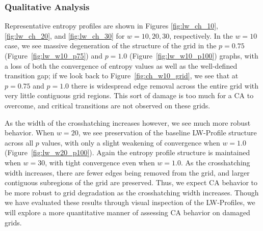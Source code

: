 \documentclass[a4paper,11pt,twoside]{report}
\begin{document}
\subsubsection*{Qualitative Analysis}

Representative entropy profiles are shown in Figures \ref{fig:lw_ch_10}, \ref{fig:lw_ch_20}, and \ref{fig:lw_ch_30} for $w=10,20,30$, respectively. In the $w=10$ case, we see massive degeneration of the structure of the grid in the $p=0.75$ (Figure~\ref{fig:lw_w10_p75}) and $p=1.0$ (Figure~\ref{fig:lw_w10_p100}) graphs, with a loss of both the convergence of entropy values as well as the well-defined transition gap; if we look back to Figure~\ref{fig:ch_w10_grid}, we see that at $p=0.75$ and $p=1.0$ there is widespread edge removal across the entire grid with very little contiguous grid regions. This sort of damage is too much for a CA to overcome, and critical transitions are not observed on these grids. 

As the width of the crosshatching increases however, we see much more robust behavior. When $w=20$, we see preservation of the baseline LW-Profile structure across all $p$ values, with only a slight weakening of convergence when $w=1.0$ (Figure~\ref{fig:lw_w20_p100}). Again the entropy profile structure is maintained when $w=30$, with tight convergence even when $w=1.0$. As the crosshatching width increases, there are fewer edges being removed from the grid, and larger contiguous subregions of the grid are preserved. Thus, we expect CA behavior to be more robust to grid degradation as the crosshatching width increases. Though we have evaluated these results through visual inspection of the LW-Profiles, we will explore a more quantitative manner of assessing CA behavior on damaged grids.
\end{document}
